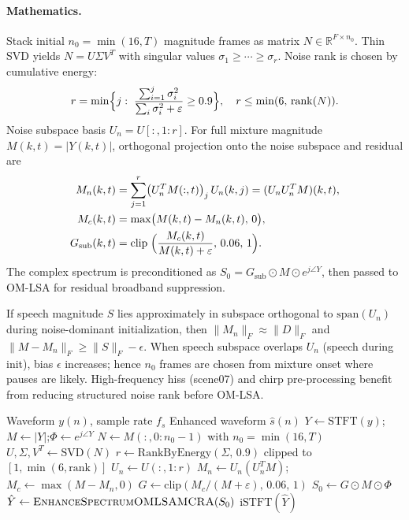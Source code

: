 \paragraph{Mathematics.}
Stack initial $n_0=\min(16,T)$ magnitude frames as matrix $N\in\mathbb{R}^{F\times n_0}$. Thin SVD yields $N = U\Sigma V^T$ with singular values $\sigma_1\ge\cdots\ge\sigma_r$. Noise rank is chosen by cumulative energy:
\begin{equation}
  r = \min\Bigl\{j:\; \frac{\sum_{i=1}^{j}\sigma_i^2}{\sum_{i}\sigma_i^2 + \varepsilon} \ge 0.9\Bigr\}, \quad r \le \min(6,\, \mathrm{rank}(N)).
  \label{eq:subspace_rank}
\end{equation}
Noise subspace basis $U_n = U[:,1:r]$. For full mixture magnitude $M(k,t)=|Y(k,t)|$, orthogonal projection onto the noise subspace and residual are
\begin{align}
  M_n(k,t) &= \sum_{j=1}^{r} \bigl(U_n^T M(:,t)\bigr)_j\, U_n(k,j) = (U_n U_n^T M)(k,t), \\
  M_c(k,t) &= \max\bigl(M(k,t) - M_n(k,t),\, 0\bigr), \\
  G_{\mathrm{sub}}(k,t) &= \mathrm{clip}\;\Bigl(\frac{M_c(k,t)}{M(k,t)+\varepsilon},\, 0.06,\, 1\Bigr).
  \label{eq:subspace_gain}
\end{align}
The complex spectrum is preconditioned as $S_0 = G_{\mathrm{sub}}\odot M \odot e^{j\angle Y}$, then passed to OM-LSA for residual broadband suppression.

\begin{proposition}
\label{prop:subspace}
If speech magnitude $S$ lies approximately in subspace orthogonal to $\mathrm{span}(U_n)$ during noise-dominant initialization, then $\|M_n\|_F \approx \|D\|_F$ and $\|M-M_n\|_F \ge \|S\|_F - \epsilon$. When speech subspace overlaps $U_n$ (speech during init), bias $\epsilon$ increases; hence $n_0$ frames are chosen from mixture onset where pauses are likely. High-frequency hiss (scene07) and chirp pre-processing benefit from reducing structured noise rank before OM-LSA.
\end{proposition}

\begin{algorithm}[H]
  \caption{Subspace projection + OM-LSA (\texttt{subspace\_denoise})}
  \label{alg:subspace}
  \begin{algorithmic}[1]
    \Require Waveform $y(n)$, sample rate $f_s$
    \Ensure Enhanced waveform $\hat{s}(n)$
    \State $Y \gets \mathrm{STFT}(y)$;\quad $M \gets |Y|$;\quad $\Phi \gets e^{j\angle Y}$
    \State $N \gets M(:, 0:n_0-1)$ with $n_0=\min(16,T)$
    \State $U,\Sigma,V^T \gets \mathrm{SVD}(N)$
    \State $r \gets \mathrm{RankByEnergy}(\Sigma,\, 0.9)$ clipped to $[1,\min(6,\mathrm{rank})]$ 
    \State $U_n \gets U(:,1:r)$
    \State $M_n \gets U_n (U_n^T M)$;\quad $M_c \gets \max(M - M_n, 0)$
    \State $G \gets \mathrm{clip}(M_c/(M+\varepsilon),\, 0.06,\, 1)$
    \State $S_0 \gets G \odot M \odot \Phi$
    \State $\hat{Y} \gets \textsc{EnhanceSpectrumOMLSAMCRA}(S_0)$
    \State \Return $\mathrm{iSTFT}(\hat{Y})$
  \end{algorithmic}
\end{algorithm}

